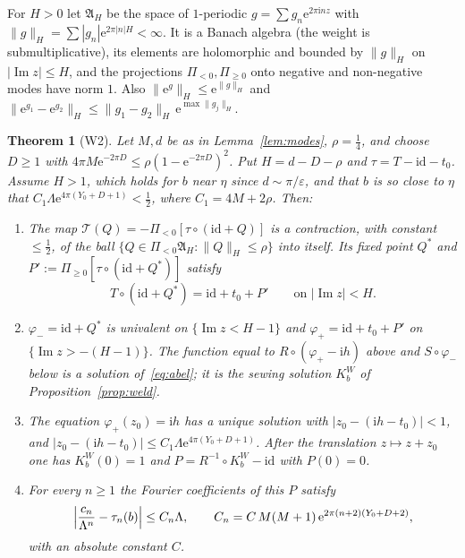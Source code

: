 \documentclass[11pt]{amsart}
\newtheorem{theorem}{Theorem}[section]
\theoremstyle{definition}
\newcommand{\Rr}{R}
\newcommand{\Kk}{K}
\newcommand{\eee}{\mathrm{e}}
\newcommand{\ii}{\mathrm{i}}
\begin{document}
For $H>0$ let $\mathfrak A_H$ be the space of $1$-periodic
$g=\sum g_n\eee^{2\pi\ii nz}$ with
$\|g\|_H=\sum|g_n|\eee^{2\pi|n|H}<\infty$.  It is a Banach algebra
(the weight is submultiplicative), its elements are holomorphic and bounded by
$\|g\|_H$ on $|\operatorname{Im}z|\le H$, and the projections
$\Pi_{<0},\Pi_{\ge0}$ onto negative and non-negative modes have norm $1$.  Also
$\|\eee^{g}\|_H\le\eee^{\|g\|_H}$ and
$\|\eee^{g_1}-\eee^{g_2}\|_H\le\|g_1-g_2\|_H\,\eee^{\max\|g_j\|_H}$.

\begin{theorem}[W2]\label{thm:W2}
Let $M,d$ be as in Lemma~\ref{lem:modes}, $\rho=\tfrac14$, and choose $D\ge1$
with $4\pi M\eee^{-2\pi D}\le\rho(1-\eee^{-2\pi D})^2$.  Put $H=d-D-\rho$ and
$\tau=T-\mathrm{id}-t_0$.  Assume $H>1$, which holds for $b$ near $\eta$ since
$d\sim\pi/\varepsilon$, and that $b$ is so close to $\eta$ that
$C_1\Lambda\eee^{4\pi(Y_0+D+1)}<\tfrac12$, where $C_1=4M+2\rho$.  Then:
\begin{enumerate}
\item The map $\mathcal T(Q)=-\Pi_{<0}[\tau\circ(\mathrm{id}+Q)]$ is a
  contraction, with constant $\le\tfrac12$, of the ball
  $\{Q\in\Pi_{<0}\mathfrak A_H:\|Q\|_H\le\rho\}$ into itself.  Its fixed point
  $Q^*$ and $P':=\Pi_{\ge0}[\tau\circ(\mathrm{id}+Q^*)]$ satisfy
  \[
   T\circ(\mathrm{id}+Q^*)=\mathrm{id}+t_0+P'\qquad\text{on }|\operatorname{Im}z|<H.
  \]
\item $\varphi_-=\mathrm{id}+Q^*$ is univalent on $\{\operatorname{Im}z<H-1\}$
  and $\varphi_+=\mathrm{id}+t_0+P'$ on $\{\operatorname{Im}z>-(H-1)\}$.  The
  function equal to $\Rr\circ(\varphi_+-\ii h)$ above and $S\circ\varphi_-$ below
  is a solution of~\eqref{eq:abel}; it is the sewing solution $\Kk^W_b$ of
  Proposition~\ref{prop:weld}.
\item The equation $\varphi_+(z_0)=\ii h$ has a unique solution with
  $|z_0-(\ii h-t_0)|<1$, and $|z_0-(\ii h-t_0)|\le C_1\Lambda\eee^{4\pi(Y_0+D+1)}$.
  After the translation $z\mapsto z+z_0$ one has $\Kk^W_b(0)=1$ and
  $P=\Rr^{-1}\circ\Kk^W_b-\mathrm{id}$ with $P(0)=0$.
\item For every $n\ge1$ the Fourier coefficients of this $P$ satisfy
  \[
   \Bigl|\frac{c_n}{\Lambda^n}-\tau_n(b)\Bigr|\le C_n\Lambda,
   \qquad C_n=C\,M(M+1)\,\eee^{2\pi(n+2)(Y_0+D+2)},
  \]
  with an absolute constant $C$.
\end{enumerate}
\end{theorem}
\end{document}
